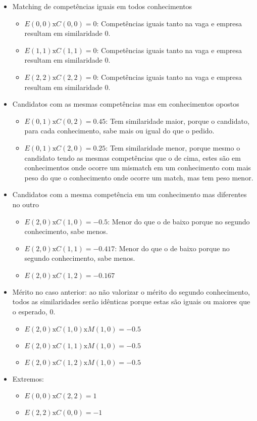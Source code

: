 \documentclass[preprint,12pt]{elsarticle}
\begin{document}
\begin{itemize}
    \item Matching de competências iguais em todos conhecimentos
    \begin{itemize}
      \item $ E(0,0) \text{x} C(0,0) = 0 $: Competências iguais tanto na vaga e empresa resultam em similaridade 0.
      \item $ E(1,1) \text{x} C(1,1) = 0 $: Competências iguais tanto na vaga e empresa resultam em similaridade 0.
      \item $ E(2,2) \text{x} C(2,2) = 0 $: Competências iguais tanto na vaga e empresa resultam em similaridade 0.
    \end{itemize}
    \item Candidatos com as mesmas competências mas em conhecimentos opostos
    \begin{itemize}
      \item $ E(0,1) \text{x} C(0,2) = 0.45 $: Tem similaridade maior, porque o candidato, para cada conhecimento, sabe mais ou igual do que o pedido.
      \item $ E(0,1) \text{x} C(2,0) = 0.25 $: Tem similaridade menor, porque mesmo o candidato tendo as mesmas competências que o de cima, estes são em conhecimentos onde ocorre um mismatch em um conhecimento com mais peso do que o conhecimento onde ocorre um match, mas tem peso menor. 
    \end{itemize}
    
    \item Candidatos com a mesma competência em um conhecimento mas diferentes no outro
    \begin{itemize}    
      \item $ E(2,0) \text{x} C(1,0) = -0.5 $: Menor do que o de baixo porque no segundo conhecimento, sabe menos.
      \item $ E(2,0) \text{x} C(1,1) = -0.417 $: Menor do que o de baixo porque no segundo conhecimento, sabe menos.
      \item $ E(2,0) \text{x} C(1,2) = -0.167 $
    \end{itemize}
    
    \item Mérito no caso anterior: ao não valorizar o mérito do segundo conhecimento, todos as similaridades serão idênticas porque estas são iguais ou maiores que o esperado, $0$.
    \begin{itemize}    
      \item $ E(2,0) \text{x} C(1,0) \text{x} M(1,0) = -0.5 $
      \item $ E(2,0) \text{x} C(1,1) \text{x} M(1,0) = -0.5 $
      \item $ E(2,0) \text{x} C(1,2) \text{x} M(1,0) = -0.5 $
    \end{itemize}
    
    \item Extremos:
    \begin{itemize}    
      \item $ E(0,0) \text{x} C(2,2) = 1 $
      \item $ E(2,2) \text{x} C(0,0) = -1 $
    \end{itemize}
\end{itemize}
\end{document}
